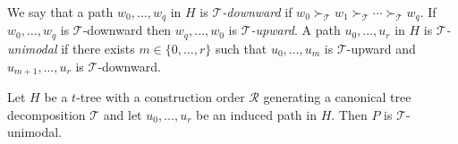 \documentclass[kpfonts]{patmorin}
\theoremstyle{named}
\begin{document}
We say that a path $w_0,\ldots,w_q$ in $H$ is \emph{$\mathcal{T}$-downward} if $w_0\succ_\mathcal{T}w_{1}\succ_\mathcal{T}\cdots\succ_\mathcal{T} w_q$. If $w_0,\ldots,w_q$ is $\mathcal{T}$-downward then $w_q,\ldots,w_0$ is \emph{$\mathcal{T}$-upward}.
%
A path $u_0,\ldots,u_r$ in $H$ is \emph{$\mathcal{T}$-unimodal} if there exists $m\in\{0,\ldots,r\}$ such that $u_0,\ldots,u_m$ is $\mathcal{T}$-upward and $u_{m+1},\ldots,u_r$ is $\mathcal{T}$-downward.

\begin{lem}\label{induced-unimodal}
    Let $H$ be a $t$-tree with a construction order $\mathcal{R}$ generating a canonical tree decomposition $\mathcal{T}$ and let $u_0,\ldots,u_r$ be an induced path in $H$.  Then $P$ is $\mathcal{T}$-unimodal.
\end{lem}
\end{document}
